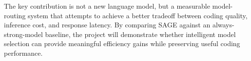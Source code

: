 \documentclass[11pt,a4paper]{article}
\begin{document}
The key contribution is not a new language model, but a
measurable model-routing system that attempts to achieve a
better tradeoff between coding quality, inference cost, and
response latency. By comparing SAGE against an
always-strong-model baseline, the project will demonstrate
whether intelligent model selection can provide meaningful
efficiency gains while preserving useful coding performance.

\end{document}
